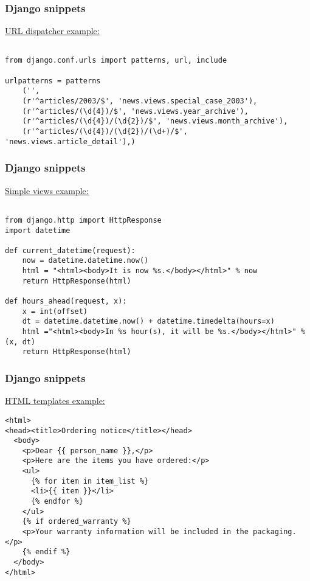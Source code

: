 \documentclass{beamer}
\begin{document}
\begin{frame}[fragile]
  \frametitle{Django snippets}
\underline{URL dispatcher example:}

	\begin{verbatim}

from django.conf.urls import patterns, url, include

urlpatterns = patterns
    ('',
    (r'^articles/2003/$', 'news.views.special_case_2003'),
    (r'^articles/(\d{4})/$', 'news.views.year_archive'),
    (r'^articles/(\d{4})/(\d{2})/$', 'news.views.month_archive'),
    (r'^articles/(\d{4})/(\d{2})/(\d+)/$', 'news.views.article_detail'),)

	\end{verbatim}

\end{frame}

\begin{frame}[fragile]
  \frametitle{Django snippets}
\underline{Simple views example:}

	\begin{verbatim}

from django.http import HttpResponse
import datetime

def current_datetime(request):
    now = datetime.datetime.now()
    html = "<html><body>It is now %s.</body></html>" % now
    return HttpResponse(html)

def hours_ahead(request, x):
    x = int(offset)
    dt = datetime.datetime.now() + datetime.timedelta(hours=x)
    html ="<html><body>In %s hour(s), it will be %s.</body></html>" % (x, dt)
    return HttpResponse(html)

	\end{verbatim}

\end{frame}

\begin{frame}[fragile]
  \frametitle{Django snippets}
\underline{HTML templates example:}

	\begin{verbatim}
<html>
<head><title>Ordering notice</title></head>
  <body>
    <p>Dear {{ person_name }},</p>
    <p>Here are the items you have ordered:</p>
    <ul>
      {% for item in item_list %}
      <li>{{ item }}</li>
      {% endfor %}
    </ul>
    {% if ordered_warranty %}
    <p>Your warranty information will be included in the packaging.</p>
    {% endif %}
  </body>
</html>
	\end{verbatim}

\end{frame}
\end{document}
